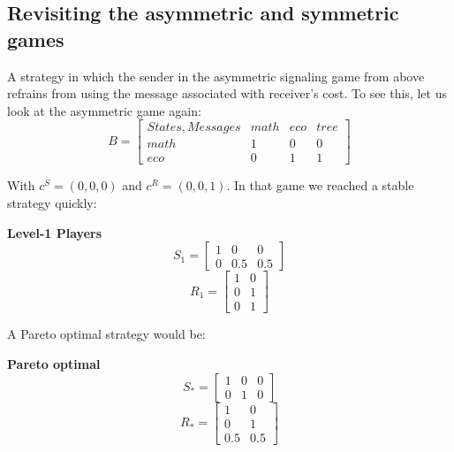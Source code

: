 \documentclass[10]{article}
\begin{document}
\subsection{Revisiting the asymmetric and symmetric games}
A strategy in which the sender in the asymmetric signaling game from above refrains from using the message associated with receiver's cost. To see this, let us look at the asymmetric game again:
 \begin{equation*}
 B =
 \begin{bmatrix}

 States, Messages & math & eco & tree \\
 math             & 1    & 0   & 0    \\
 eco              & 0    & 1   & 1
 \end{bmatrix}
 \end{equation*}

 With $c^S=(0,0,0)$ and $c^R=(0,0,1)$. In that game we reached a stable strategy quickly:

\textbf{Level-1 Players}\\
\begin{equation*}
S_1=
\begin{bmatrix}
1 & 0 & 0\\
0 & 0.5 & 0.5
\end{bmatrix}
\end{equation*}
\begin{equation*}
R_1=
\begin{bmatrix}
1 & 0\\
0 & 1\\
0 & 1
\end{bmatrix}
\end{equation*}

A Pareto optimal strategy would be:

\textbf{Pareto optimal}\\
\begin{equation*}
S_*=
\begin{bmatrix}
1 & 0 & 0\\
0 & 1 & 0
\end{bmatrix}
\end{equation*}
\begin{equation*}
R_*=
\begin{bmatrix}
1 & 0\\
0 & 1\\
0.5 & 0.5
\end{bmatrix}
\end{equation*}
\end{document}
